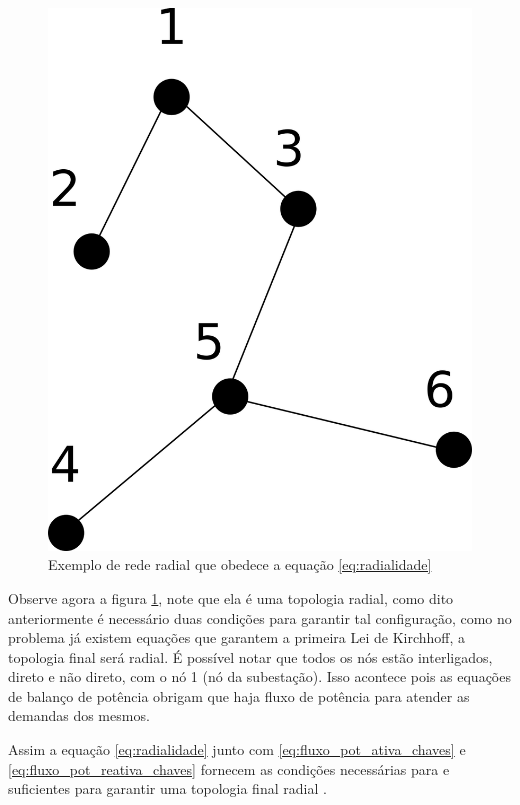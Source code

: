 \begin{figure}[H]
    \centering
    \includegraphics[scale=0.6]{4_Modeling/restricao_radialidade.png}
    \caption{Exemplo de rede radial que obedece a equação \eqref{eq:radialidade}}
    \label{fig:radialidade_right}
\end{figure}

Observe agora a figura \ref{fig:radialidade_right}, note que ela é uma topologia radial, como dito anteriormente é necessário duas condições para garantir tal configuração, como no problema já existem equações que garantem a primeira Lei de Kirchhoff, a topologia final será radial. 
É possível notar que todos os nós estão interligados, direto e não direto, com o nó 1 (nó da subestação).
Isso acontece pois as equações de balanço de potência obrigam que haja fluxo de potência para atender as demandas dos mesmos.

Assim a equação \eqref{eq:radialidade} junto com \eqref{eq:fluxo_pot_ativa_chaves} e \eqref{eq:fluxo_pot_reativa_chaves} fornecem as condições necessárias para e suficientes para garantir uma topologia final radial \cite{Lavorato2012ImposingProblems}.

